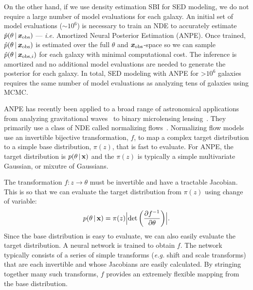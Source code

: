 On the other hand, if we use density estimation SBI for SED modeling, we do not
require a large number of model evaluations for each galaxy. 
An initial set of model evaluations (${\sim}10^6$) is necessary to train an NDE
to accurately estimate $\hat{p}(\theta \,|\, \textbf{\textit{x}}_{\rm obs})$ --- \emph{i.e.} Amortized
Neural Posterior Estimation (ANPE).
Once trained, $\hat{p}(\theta \,|\, \textbf{\textit{x}}_{\rm obs})$ is estimated over the full
$\theta$ and $\textbf{\textit{x}}_{\rm obs}$-space so we can sample $\hat{p}(\theta\,|\,\textbf{\textit{x}}_{{\rm
obs}, i})$ for each galaxy with minimal computational cost. 
The inference is amortized and no additional model evaluations are
needed to generate the posterior for each galaxy. 
In total, SED modeling with ANPE for >$10^6$ galaxies requires the same number
of model evaluations as analyzing tens of galaxies using MCMC. 

ANPE has recently been applied to a broad range of astronomical applications
from analyzing gravitational waves~\citep[\emph{e.g.}][]{wong2020,dax2021} to
binary microlensing lensing~\citep{zhang2021}.
They primarily use a class of NDE called normalizing flows~\citep{tabak2010,
tabak2013}.
Normalizing flow models use an invertible bijective transformation, $f$, to map
a complex target distribution to a simple base distribution, $\pi(z)$, that is
fast to evaluate.
For ANPE, the target distribution is $p(\theta \,|\, {\bf x})$ and the
$\pi(z)$ is typically a simple multivariate Gaussian, or mixutre of Gaussians.

The transformation $f: z \rightarrow \theta$ must be invertible and have a
tractable Jacobian. 
This is so that we can evaluate the target distribution from $\pi(z)$ using
change of variable:  
\begin{equation} \label{normflow}
    p(\theta \given {\bf x}) = \pi(z) \Bigl|{\rm det} \left(\frac{\partial
    f^{-1}}{\partial \theta} \right)\Bigr|.
\end{equation} 
Since the base distribution is easy to evaluate, we can also easily evaluate
the target distribution.  
A neural network is trained to obtain $f$.
The network typically consists of a series of simple transforms (\emph{e.g.}
shift and scale transforms) that are each invertible and whose Jacobians are
easily calculated. 
By stringing together many such transforms, $f$ provides an extremely flexible
mapping from the base distribution.

